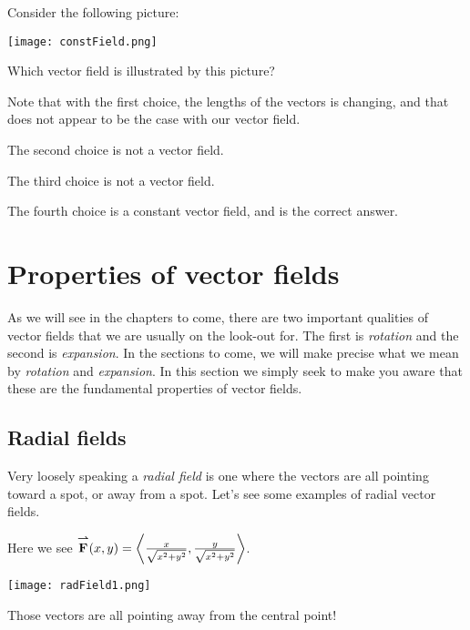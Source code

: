 \documentclass{ximera}
\begin{document}
\begin{question}
  Consider the following picture:
  \begin{image}
    \texttt{[image: constField.png]}
  \end{image}
  Which vector field is illustrated by this picture?
  \begin{multipleChoice}
  \end{multipleChoice}
  \begin{feedback}[correct]
    Note that with the first choice, the lengths of the vectors is
    changing, and that does not appear to be the case with our vector
    field.

    The second choice is not a vector field.

    The third choice is not a vector field.

    The fourth choice is a constant vector field, and is the correct answer.
  \end{feedback}
\end{question}



\section{Properties of vector fields}

As we will see in the chapters to come, there are two important
qualities of vector fields that we are usually on the look-out
for. The first is \textit{rotation} and the second is
\textit{expansion}. In the sections to come, we will make precise
what we mean by \textit{rotation} and \textit{expansion}. In this
section we simply seek to make you aware that these are the
fundamental properties of vector fields.

\subsection{Radial fields}

Very loosely speaking a \textit{radial field} is one where the vectors
are all pointing toward a spot, or away from a spot.  Let's see some
examples of radial vector fields.
\begin{example}
  Here we see ${\overset{\boldsymbol{\rightharpoonup}}{\mathbf{F}}}\hspace{0in}(x,y) =
  \left\langle \frac{x}{\sqrt{x^2+y^2}},\frac{y}{\sqrt{x^2+y^2}}\right\rangle$.
  \begin{image}
    \texttt{[image: radField1.png]}
  \end{image}
Those vectors are all pointing away from the central point!
\end{example}
\end{document}
